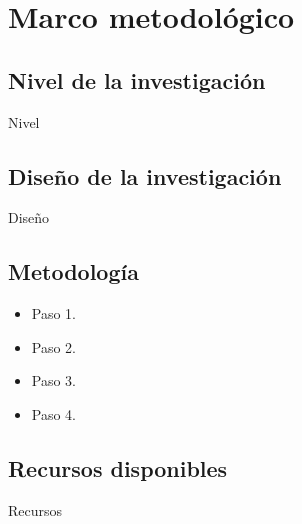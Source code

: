 \chapter{Marco metodológico}

\section{Nivel de la investigación}

Nivel

\newpage
\section{Diseño de la investigación}

Diseño

\newpage
\section{Metodología}

\begin{itemize}
        \item Paso 1.
        \item Paso 2.
        \item Paso 3.
        \item Paso 4.
\end{itemize}

\newpage
\section{Recursos disponibles}

Recursos




